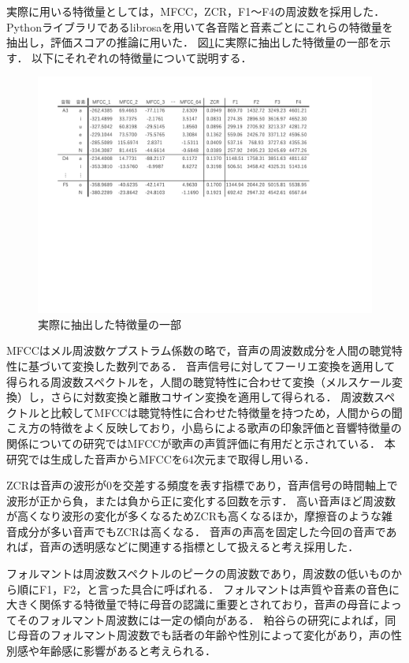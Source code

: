 実際に用いる特徴量としては，MFCC，ZCR，F1〜F4の周波数を採用した．
Pythonライブラリであるlibrosaを用いて各音階と音素ごとにこれらの特徴量を抽出し，評価スコアの推論に用いた．
図\ref{fig:mfcc}に実際に抽出した特徴量の一部を示す．
以下にそれぞれの特徴量について説明する．

\begin{figure}[htb]
  \centering
  \includegraphics[width=0.9\linewidth]{fig/features_sample_ama.pdf}
  \caption{実際に抽出した特徴量の一部}
  \label{fig:mfcc}
\end{figure}

MFCCはメル周波数ケプストラム係数の略で，音声の周波数成分を人間の聴覚特性に基づいて変換した数列である．
音声信号に対してフーリエ変換を適用して得られる周波数スペクトルを，人間の聴覚特性に合わせて変換（メルスケール変換）し，さらに対数変換と離散コサイン変換を適用して得られる．
周波数スペクトルと比較してMFCCは聴覚特性に合わせた特徴量を持つため，人間からの聞こえ方の特徴をよく反映しており，小島らによる歌声の印象評価と音響特徴量の関係についての研究\cite{mfcc_cute}ではMFCCが歌声の声質評価に有用だと示されている．
本研究では生成した音声からMFCCを64次元まで取得し用いる．

ZCRは音声の波形が0を交差する頻度を表す指標であり，音声信号の時間軸上で波形が正から負，または負から正に変化する回数を示す．
高い音声ほど周波数が高くなり波形の変化が多くなるためZCRも高くなるほか，摩擦音のような雑音成分が多い音声でもZCRは高くなる．
音声の声高を固定した今回の音声であれば，音声の透明感などに関連する指標として扱えると考え採用した．

フォルマントは周波数スペクトルのピークの周波数であり，周波数の低いものから順にF1，F2，と言った具合に呼ばれる．
フォルマントは声質や音素の音色に大きく関係する特徴量で特に母音の認識に重要とされており，音声の母音によってそのフォルマント周波数には一定の傾向がある．
粕谷らの研究によれば，同じ母音のフォルマント周波数でも話者の年齢や性別によって変化があり\cite{formant}，声の性別感や年齢感に影響があると考えられる．

